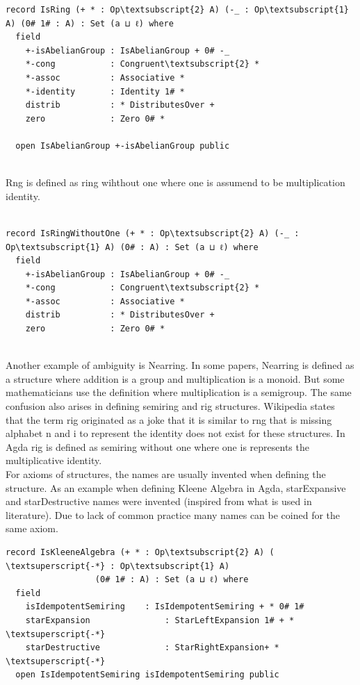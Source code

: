 \begin{BVerbatim}[commandchars=\\\{\}]
record IsRing (+ * : Op\textsubscript{2} A) (-_ : Op\textsubscript{1} A) (0# 1# : A) : Set (a ⊔ ℓ) where
  field
    +-isAbelianGroup : IsAbelianGroup + 0# -_
    *-cong           : Congruent\textsubscript{2} *
    *-assoc          : Associative *
    *-identity       : Identity 1# *
    distrib          : * DistributesOver +
    zero             : Zero 0# *

  open IsAbelianGroup +-isAbelianGroup public
\end{BVerbatim} 
\\
Rng is defined as ring wihthout one where one is assumend to be multiplication identity.\\
\\
\begin{BVerbatim}[commandchars=\\\{\}]
record IsRingWithoutOne (+ * : Op\textsubscript{2} A) (-_ : Op\textsubscript{1} A) (0# : A) : Set (a ⊔ ℓ) where
  field
    +-isAbelianGroup : IsAbelianGroup + 0# -_
    *-cong           : Congruent\textsubscript{2} *
    *-assoc          : Associative *
    distrib          : * DistributesOver +
    zero             : Zero 0# *
\end{BVerbatim}
\\

Another example of ambiguity is Nearring. In some papers, Nearring is defined as a structure where addition is a group and multiplication is a monoid. But some mathematicians use the definition where multiplication is a semigroup. The same confusion also arises in defining semiring and rig structures. Wikipedia states that the term rig originated as a joke that it is similar to rng that is missing alphabet n and i to represent the identity does not exist for these structures. In Agda rig is defined as semiring without one where one is represents the multiplicative identity.\\

For axioms of structures, the names are usually invented when defining the structure. As an example when defining Kleene Algebra in Agda, starExpansive and starDestructive names were invented (inspired from what is used in literature). Due to lack of common practice many names can be coined for the same axiom.

\begin{Verbatim}[commandchars=\\\{\}]
record IsKleeneAlgebra (+ * : Op\textsubscript{2} A) ( \textsuperscript{-*} : Op\textsubscript{1} A)
				  (0# 1# : A) : Set (a ⊔ ℓ) where
  field
    isIdempotentSemiring    : IsIdempotentSemiring + * 0# 1#
    starExpansion               : StarLeftExpansion 1# + * \textsuperscript{-*}
    starDestructive             : StarRightExpansion+ * \textsuperscript{-*}
  open IsIdempotentSemiring isIdempotentSemiring public
\end{Verbatim} 

